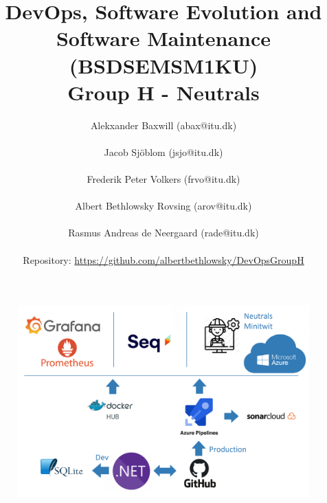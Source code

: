 \documentclass{article}
\begin{document}
\title{%
  DevOps, Software Evolution and Software Maintenance (BSDSEMSM1KU) \\
  \large Group H - Neutrals}

\author{Alekxander Baxwill (abax@itu.dk)\\ \\ Jacob Sjöblom (jsjo@itu.dk) \\ \\ Frederik Peter Volkers (frvo@itu.dk) \\ \\ Albert Bethlowsky Rovsing (arov@itu.dk) \\ \\ Rasmus Andreas de Neergaard (rade@itu.dk) \\ \\ Repository: \url{https://github.com/albertbethlowsky/DevOpsGroupH}} 



\maketitle


\begin{figure}[H]
\centering
\includegraphics[width=1\textwidth]{images/SystemDesign.png}
\end{figure}
\newpage

\tableofcontents
\newpage

\newpage
\end{document}

